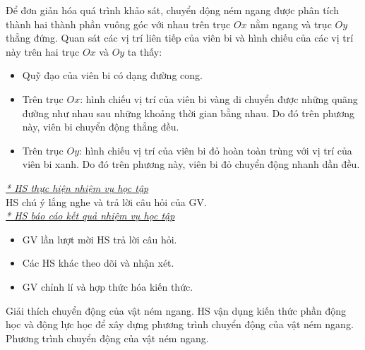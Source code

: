 {\begin{itemize}[label=-]
\begin{center}
		\end{center}
		Để đơn giản hóa quá trình khảo sát, chuyển dộng ném ngang được phân tích thành hai thành phần vuông góc với nhau trên trục $Ox$ nằm ngang và trục $Oy$ thẳng đứng. Quan sát các vị trí liên tiếp của viên bi và hình chiếu của các vị trí này trên hai trục $Ox$ và $Oy$ ta thấy:
		\begin{itemize}
			\item Quỹ đạo của viên bi có dạng đường cong.
			\item Trên trục $Ox$: hình chiếu vị trí của viên bi vàng di chuyển được những quãng đường như nhau sau những khoảng thời gian bằng nhau. Do đó trên phương này, viên bi chuyển động thẳng đều.
			\item Trên trục $Oy$: hình chiếu vị trí của viên bi đỏ hoàn toàn trùng với vị trí của viên bi xanh. Do đó trên phương này, viên bi đỏ chuyển động nhanh dần đều.
		\end{itemize}
	\end{itemize}
	\textit{\underline{* HS thực hiện nhiệm vụ học tập}}\\
HS chú ý lắng nghe và trả lời câu hỏi của GV.\\
	\textit{\underline{* HS báo cáo kết quả nhiệm vụ học tập}}
	\begin{itemize}[label=-]
		\item GV lần lượt mời HS trả lời câu hỏi.
		\item Các HS khác theo dõi và nhận xét.
		\item GV chỉnh lí và hợp thức hóa kiến thức.
	\end{itemize}
}
\hoatdong
{Giải thích chuyển động của vật ném ngang.
}
{HS vận dụng kiến thức phần động học và động lực học để xây dựng phương trình chuyển động của vật ném ngang.
}
{Phương trình chuyển động của vật ném ngang.
}
